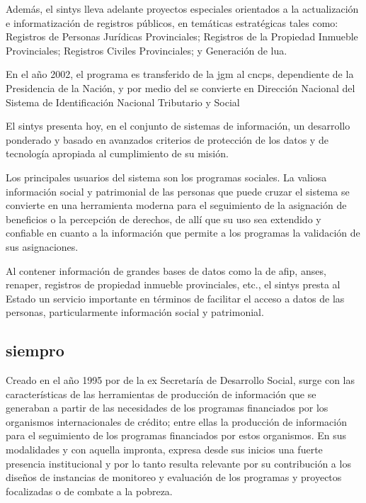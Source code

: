 Además, el \ac{sintys} lleva adelante proyectos especiales orientados a la actualización e informatización de registros públicos, en temáticas estratégicas tales como: Registros de Personas Jurídicas Provinciales; Registros de la Propiedad Inmueble Provinciales; Registros Civiles Provinciales; y Generación de \ac{lua}.

En el año 2002, el programa es transferido de la \ac{jgm} al \ac{cncps}, dependiente de la Presidencia de la Nación, y por medio del \textcite{decreto78} se convierte en Dirección Nacional del Sistema de Identificación Nacional Tributario y Social




El \ac{sintys} presenta hoy, en el conjunto de sistemas de información, un desarrollo ponderado y basado en avanzados criterios de protección de los datos y de tecnología apropiada al cumplimiento de su misión.

Los principales usuarios del sistema son los programas sociales. La valiosa información social y patrimonial de las personas que puede cruzar el sistema se convierte en una herramienta moderna para el seguimiento de la asignación de beneficios o la percepción de derechos, de allí que su uso sea extendido y confiable en cuanto a la información que permite a los programas la validación de sus asignaciones.

Al contener información de grandes bases de datos como la de \ac{afip}, \ac{anses}, \ac{renaper}, registros de propiedad inmueble provinciales, etc., el \ac{sintys} presta al Estado un servicio importante en términos de facilitar el acceso a datos de las personas, particularmente información social y patrimonial. 

\subsection{\acrfull{siempro}}

Creado en el año 1995 por \citeauthor{resolucion2851} de la ex Secretaría de Desarrollo Social,  surge con las características de las herramientas de producción de información que se generaban a partir de las necesidades de los programas financiados por los organismos internacionales de crédito; entre ellas la producción de información para el seguimiento de los programas financiados por estos organismos. En sus modalidades y con aquella impronta, expresa desde sus inicios una fuerte presencia institucional y por lo tanto resulta relevante por su contribución a los diseños de instancias de monitoreo y evaluación de los programas y proyectos focalizadas o de combate a la pobreza. 

